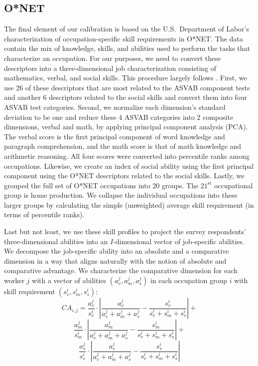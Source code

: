 \documentclass[onehalfspacing,11pt]{article}
\begin{document}
	\subsection{O*NET}
	The final element of our calibration is based on the U.S.~Department of Labor’s characterization of occupation-specific skill requirements in O*NET. The data contain the mix of knowledge, skills, and abilities used to perform the tasks that characterize an occupation. For our purposes, we need to convert these descriptors into a three-dimensional job characterization consisting of mathematics, verbal, and social skills. This procedure largely follows \cite{Guvenen:2020}. First, we use 26 of these descriptors that are most related to the ASVAB component tests and another 6 descriptors related to the social skills and convert them into four ASVAB test categories. Second, we normalize each dimension’s standard deviation to be one and reduce these 4 ASVAB categories into 2 composite dimensions, verbal and math, by applying principal component analysis (PCA). The verbal score is the first principal component of word knowledge and paragraph comprehension, and the math score is that of math knowledge and arithmetic reasoning. All four scores were converted into percentile ranks among occupations. Likewise, we create an index of social ability using the first principal component using the O*NET descriptors related to the social skills. Lastly, we grouped the full set of O*NET occupations into 20 groups. The $21^{\textrm{st}}$ occupational group is home production. We collapse the individual occupations into these larger groups by calculating the simple (unweighted) average skill requirement (in terms of percentile ranks).
	
	Last but not least, we use these skill profiles to project the survey respondents' three-dimensional abilities into an $I$-dimensional vector of job-specific abilities. We decompose the job-specific ability into an absolute and a comparative dimension in a way that aligns naturally with the notion of absolute and comparative advantage. We characterize the comparative dimension for each worker $j$ with a vector of abilities $(a^j_v, a^j_m, a^j_s)$ in each occupation group $i$ with skill requirement $(s^i_v, s^i_m, s^i_s)$:
	\[CA_{i,j}=\frac{a^j_v}{s^i_v} \cdot \left|\frac{a^j_v}{a^j_v+a^j_m+a^j_s}-\frac{s^i_v}{s^i_v+s^i_m+s^i_s}\right|+\]
	\[\frac{a^j_m}{s^i_m} \cdot \left|\frac{a^j_m}{a^j_v+a^j_m+a^j_s}-\frac{s^i_m}{s^i_v+s^i_m+s^i_s}\right|+\]
	\[\frac{a^j_s}{s^i_s} \cdot \left|\frac{a^j_s}{a^j_v+a^j_m+a^j_s}-\frac{s^i_s}{s^i_v+s^i_m+s^i_s}\right|\]
	
\end{document}
